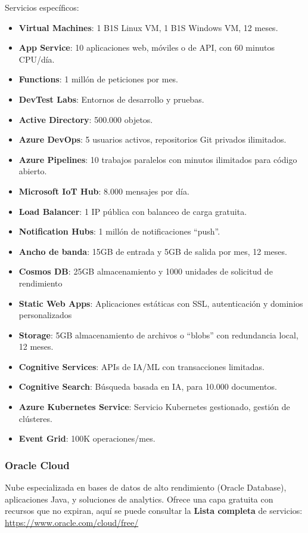 Servicios específicos:
\begin{itemize}
	\item \textbf{Virtual Machines}: 1 B1S Linux VM, 1 B1S Windows VM, 12 meses.
	\item \textbf{App Service}: 10 aplicaciones web, móviles o de API, con 60 minutos CPU/día.
	\item \textbf{Functions}: 1 millón de peticiones por mes.
	\item \textbf{DevTest Labs}: Entornos de desarrollo y pruebas.
	\item \textbf{Active Directory}: 500.000 objetos.
	\item \textbf{Azure DevOps}: 5 usuarios activos, repositorios Git privados ilimitados.
	\item \textbf{Azure Pipelines}: 10 trabajos paralelos con minutos ilimitados para código abierto.
	\item \textbf{Microsoft IoT Hub}: 8.000 mensajes por día.
	\item \textbf{Load Balancer}: 1 IP pública con balanceo de carga gratuita.
	\item \textbf{Notification Hubs}: 1 millón de notificaciones ``push''.
	\item \textbf{Ancho de banda}: 15GB de entrada y 5GB de salida por mes, 12 meses.
	\item \textbf{Cosmos DB}: 25GB almacenamiento y 1000 unidades de solicitud de rendimiento
	\item \textbf{Static Web Apps}: Aplicaciones estáticas con SSL, autenticación y dominios personalizados
	\item \textbf{Storage}: 5GB almacenamiento de archivos o ``blobs'' con redundancia local, 12 meses.
	\item \textbf{Cognitive Services}: APIs de IA/ML con transacciones limitadas.
	\item \textbf{Cognitive Search}: Búsqueda basada en IA, para 10.000 documentos.
	\item \textbf{Azure Kubernetes Service}: Servicio Kubernetes gestionado, gestión de clústeres.
	\item \textbf{Event Grid}: 100K operaciones/mes.
\end{itemize}

\subsubsection*{Oracle Cloud}

Nube especializada en bases de datos de alto rendimiento (Oracle Database), aplicaciones Java, y soluciones de analytics. Ofrece una capa gratuita con recursos que no expiran, aquí se puede consultar la \textbf{Lista completa} de servicios: \url{https://www.oracle.com/cloud/free/}

